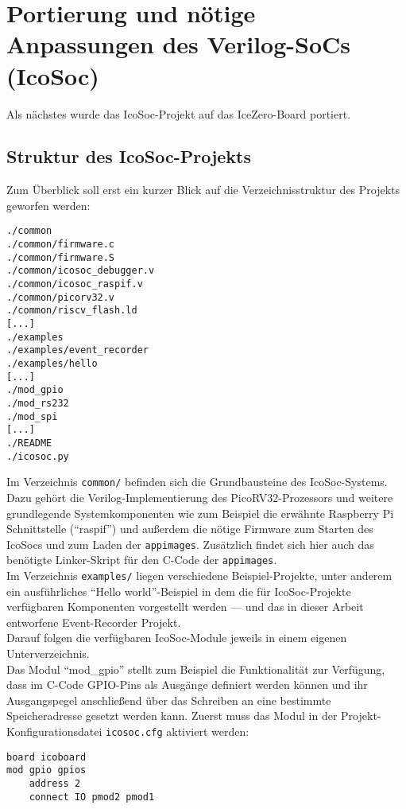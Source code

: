 {\section{Portierung und nötige Anpassungen des Verilog-SoCs (IcoSoc)}
\label{ch:Implementierung:sec:icosoc}
Als nächstes wurde das IcoSoc-Projekt auf das IceZero-Board portiert. 

\subsection{Struktur des IcoSoc-Projekts}
Zum Überblick soll erst ein kurzer Blick auf die Verzeichnisstruktur des Projekts geworfen werden:
\begin{verbatim}
./common
./common/firmware.c
./common/firmware.S
./common/icosoc_debugger.v
./common/icosoc_raspif.v
./common/picorv32.v
./common/riscv_flash.ld
[...]
./examples
./examples/event_recorder
./examples/hello
[...]
./mod_gpio
./mod_rs232
./mod_spi
[...]
./README
./icosoc.py
\end{verbatim}

Im Verzeichnis {\tt common/} befinden sich die Grundbausteine des IcoSoc-Systems. Dazu gehört die Verilog-Implementierung des PicoRV32-Prozessors und weitere grundlegende Systemkomponenten wie zum Beispiel die erwähnte Raspberry Pi Schnittstelle (``raspif'') und außerdem die nötige Firmware zum Starten des IcoSocs und zum Laden der {\tt appimages}. Zusätzlich findet sich hier auch das benötigte Linker-Skript für den C-Code der {\tt appimages}.\\
Im Verzeichnis {\tt examples/} liegen verschiedene Beispiel-Projekte, unter anderem ein ausführliches ``Hello world''-Beispiel in dem die für IcoSoc-Projekte verfügbaren Komponenten vorgestellt werden --- und das in dieser Arbeit entworfene Event-Recorder Projekt.\\
Darauf folgen die verfügbaren IcoSoc-Module jeweils in einem eigenen Unterverzeichnis.\\
Das Modul ``mod\_gpio'' stellt zum Beispiel die Funktionalität zur Verfügung, dass im C-Code GPIO-Pins als Ausgänge definiert werden können und ihr Ausgangspegel anschließend über das Schreiben an eine bestimmte Speicheradresse gesetzt werden kann. 
Zuerst muss das Modul in der Projekt-Konfigurationsdatei {\tt icosoc.cfg} aktiviert werden:
\begin{verbatim}
board icoboard
mod gpio gpios
    address 2
    connect IO pmod2 pmod1
\end{verbatim}

}
